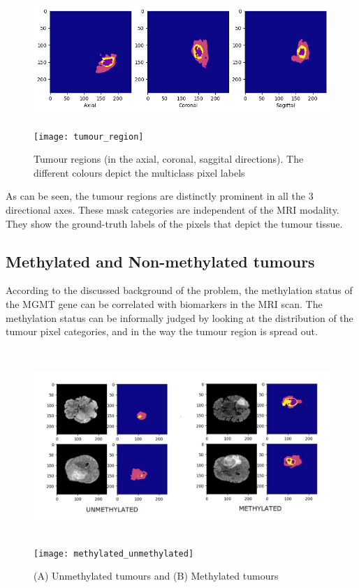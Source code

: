 \begin{figure}[H]
  \begin{center}
    \leavevmode
    \ifpdf
      \includegraphics[height=2in]{Experimental/Chapter2Figs/tumour_regions.jpg}
    \else
      \texttt{[image: tumour\_region]}
    \fi
    \caption{Tumour regions (in the axial, coronal, saggital directions). The different colours depict the multiclass pixel labels}
    \label{tumour_region}
  \end{center}
\end{figure}
As can be seen, the tumour regions are distinctly prominent in all the 3 directional axes. These mask categories are independent of the MRI modality. They show the ground-truth labels of the pixels that depict the tumour tissue. 

\subsection{Methylated and Non-methylated tumours}
According to the discussed background of the problem, the methylation status of the MGMT gene can be correlated with biomarkers in the MRI scan. The methylation status can be informally judged by looking at the distribution of the tumour pixel categories, and in the way the tumour region is spread out. 



\begin{figure}[H]
  \begin{center}
    \leavevmode
    \ifpdf
      \includegraphics[height=2.9in]{Experimental/Chapter2Figs/methylated_unmethylated.jpg}
    \else
      \texttt{[image: methylated\_unmethylated]}
    \fi
    \caption{(A) Unmethylated tumours and (B) Methylated tumours}
    \label{methylated_unmethylated}
  \end{center}
\end{figure}

